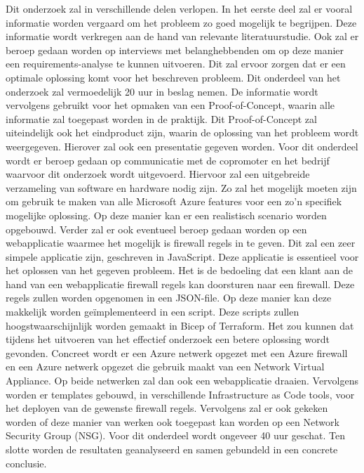 Dit onderzoek zal in verschillende delen verlopen. In het eerste deel zal er vooral informatie worden vergaard om het probleem zo goed mogelijk te begrijpen. Deze informatie wordt verkregen aan de hand van relevante literatuurstudie. Ook zal er beroep gedaan worden op interviews met belanghebbenden om op deze manier een requirements-analyse te kunnen uitvoeren. Dit zal ervoor zorgen dat er een optimale oplossing komt voor het beschreven probleem. Dit onderdeel van het onderzoek zal vermoedelijk 20 uur in beslag nemen. 
De informatie wordt vervolgens gebruikt voor het opmaken van een Proof-of-Concept, waarin alle informatie zal toegepast worden in de praktijk. Dit Proof-of-Concept zal uiteindelijk ook het eindproduct zijn, waarin de oplossing van het probleem wordt weergegeven. Hierover zal ook een presentatie gegeven worden. Voor dit onderdeel wordt er beroep gedaan op communicatie met de copromoter en het bedrijf waarvoor dit onderzoek wordt uitgevoerd. Hiervoor zal een uitgebreide verzameling van software en hardware nodig zijn. Zo zal het mogelijk moeten zijn om gebruik te maken van alle Microsoft Azure features voor een zo'n specifiek mogelijke oplossing. Op deze manier kan er een realistisch scenario worden opgebouwd. Verder zal er ook eventueel beroep gedaan worden op een webapplicatie waarmee het mogelijk is firewall regels in te geven. Dit zal een zeer simpele applicatie zijn, geschreven in JavaScript. Deze applicatie is essentieel voor het oplossen van het gegeven probleem. Het is de bedoeling dat een klant aan de hand van een webapplicatie firewall regels kan doorsturen naar een firewall. Deze regels zullen worden opgenomen in een JSON-file. Op deze manier kan deze makkelijk worden geïmplementeerd in een script. Deze scripts zullen hoogstwaarschijnlijk worden gemaakt in Bicep of Terraform.  
Het zou kunnen dat tijdens het uitvoeren van het effectief onderzoek een betere oplossing wordt gevonden.
Concreet wordt er een Azure netwerk opgezet met een Azure firewall en een Azure netwerk opgezet die gebruik maakt van een Network Virtual Appliance. Op beide netwerken zal dan ook een webapplicatie draaien. Vervolgens worden er templates gebouwd, in verschillende Infrastructure as Code tools, voor het deployen van de gewenste firewall regels. Vervolgens zal er ook gekeken worden of deze manier van werken ook toegepast kan worden op een Network Security Group (NSG). Voor dit onderdeel wordt ongeveer 40 uur geschat. Ten slotte worden de resultaten geanalyseerd en samen gebundeld in een concrete conclusie. 

